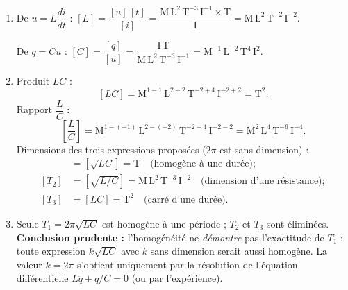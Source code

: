 \documentclass[11pt]{article}
\begin{document}
\begin{corrige}
\begin{enumerate}
    \item De $u = L\dfrac{di}{dt}$ : $[L] = \dfrac{[u]\,[t]}{[i]} = \dfrac{\text{M}\,\text{L}^2\,\text{T}^{-3}\,\text{I}^{-1} \times \text{T}}{\text{I}} = \text{M}\,\text{L}^2\,\text{T}^{-2}\,\text{I}^{-2}$.

    De $q = Cu$ : $[C] = \dfrac{[q]}{[u]} = \dfrac{\text{I}\,\text{T}}{\text{M}\,\text{L}^2\,\text{T}^{-3}\,\text{I}^{-1}} = \text{M}^{-1}\,\text{L}^{-2}\,\text{T}^{4}\,\text{I}^{2}$.
    \item Produit $LC$ :
    \[ [LC] = \text{M}^{1-1}\,\text{L}^{2-2}\,\text{T}^{-2+4}\,\text{I}^{-2+2} = \text{T}^2. \]
    Rapport $\dfrac{L}{C}$ :
    \[ \left[\dfrac{L}{C}\right] = \text{M}^{1-(-1)}\,\text{L}^{2-(-2)}\,\text{T}^{-2-4}\,\text{I}^{-2-2} = \text{M}^2\,\text{L}^4\,\text{T}^{-6}\,\text{I}^{-4}. \]
    Dimensions des trois expressions proposées ($2\pi$ est sans dimension) :
    \begin{align*}
    [T_1] &= \left[\sqrt{LC}\right] = \text{T} \quad \text{(homogène à une durée)} ;\\
    [T_2] &= \left[\sqrt{L/C}\right] = \text{M}\,\text{L}^2\,\text{T}^{-3}\,\text{I}^{-2} \quad \text{(dimension d'une résistance)} ;\\
    [T_3] &= [LC] = \text{T}^2 \quad \text{(carré d'une durée)}.
    \end{align*}
    \item Seule $T_1 = 2\pi\sqrt{LC}$ est homogène à une période ; $T_2$ et $T_3$ sont éliminées. \textbf{Conclusion prudente :} l'homogénéité ne \emph{démontre} pas l'exactitude de $T_1$ : toute expression $k\sqrt{LC}$ avec $k$ sans dimension serait aussi homogène. La valeur $k = 2\pi$ s'obtient uniquement par la résolution de l'équation différentielle $L\ddot{q} + q/C = 0$ (ou par l'expérience).
\end{enumerate}
\end{corrige}
\end{document}
